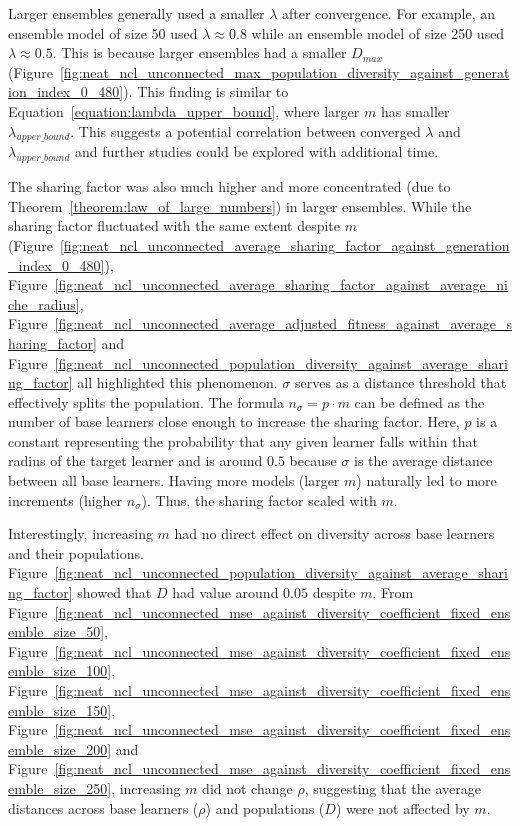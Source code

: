 Larger ensembles generally used a smaller $\lambda$ after convergence. For example, an ensemble model of size 50 used $\lambda \approx 0.8$ while an ensemble model of size 250 used $\lambda \approx 0.5$. This is because larger ensembles had a smaller $D_{max}$ (Figure~\ref{fig:neat_ncl_unconnected_max_population_diversity_against_generation_index_0_480}). This finding is similar to Equation~\ref{equation:lambda_upper_bound}, where larger $m$ has smaller $\lambda_{upper\_bound}$. This suggests a potential correlation between converged $\lambda$ and $\lambda_{upper\_bound}$ and further studies could be explored with additional time. 

The sharing factor was also much higher and more concentrated (due to Theorem~\ref{theorem:law_of_large_numbers}) in larger ensembles. While the sharing factor fluctuated with the same extent despite $m$ (Figure~\ref{fig:neat_ncl_unconnected_average_sharing_factor_against_generation_index_0_480}), Figure~\ref{fig:neat_ncl_unconnected_average_sharing_factor_against_average_niche_radius}, Figure~\ref{fig:neat_ncl_unconnected_average_adjusted_fitness_against_average_sharing_factor} and Figure~\ref{fig:neat_ncl_unconnected_population_diversity_against_average_sharing_factor} all highlighted this phenomenon. $\sigma$ serves as a distance threshold that effectively splits the population. The formula $n_{\sigma} = p \cdot m$ can be defined as the number of base learners close enough to increase the sharing factor. Here, $p$ is a constant representing the probability that any given learner falls within that radius of the target learner and is around $0.5$ because $\sigma$ is the average distance between all base learners. Having more models (larger $m$) naturally led to more increments (higher $n_{\sigma}$). Thus, the sharing factor scaled with $m$. 

Interestingly, increasing $m$ had no direct effect on diversity across base learners and their populations. Figure~\ref{fig:neat_ncl_unconnected_population_diversity_against_average_sharing_factor} showed that $D$ had value around $0.05$ despite $m$. From Figure~\ref{fig:neat_ncl_unconnected_mse_against_diversity_coefficient_fixed_ensemble_size_50}, Figure~\ref{fig:neat_ncl_unconnected_mse_against_diversity_coefficient_fixed_ensemble_size_100}, Figure~\ref{fig:neat_ncl_unconnected_mse_against_diversity_coefficient_fixed_ensemble_size_150}, Figure~\ref{fig:neat_ncl_unconnected_mse_against_diversity_coefficient_fixed_ensemble_size_200} and Figure~\ref{fig:neat_ncl_unconnected_mse_against_diversity_coefficient_fixed_ensemble_size_250}, increasing $m$ did not change $\rho$, suggesting that the average distances across base learners ($\rho$) and populations ($D$) were not affected by $m$. 

